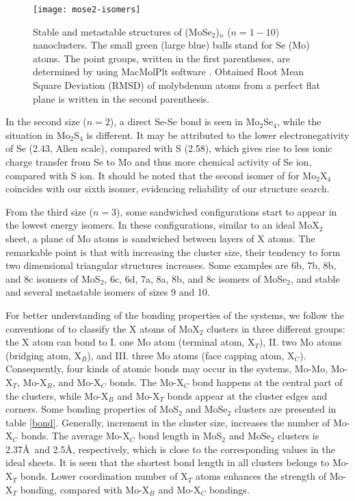 \documentclass[nofootinbib,10pt,aip,twocolumn,showpacs]{revtex4-1}
\begin{document}
\begin{figure*}
\texttt{[image: mose2-isomers]}
\caption{\label{struct-MoSe2}
 Stable and metastable structures of (MoSe$_2$)$_n$ ($n=1-10$) nanoclusters.
 The small green (large blue) balls stand for Se (Mo) atoms.
 The point groups, written in the first parentheses, 
 are determined by using MacMolPlt software \cite{bode1998macmolplt}.
 Obtained Root Mean Square Deviation (RMSD) of molybdenum atoms
 from a perfect flat plane is written in the second parenthesis.
}
\end{figure*}


In the second size ($n=2$), a direct Se-Se bond is seen in Mo$_{2}$Se$_{4}$,
while the situation in Mo$_{2}$S$_{4}$ is different.
It may be attributed to the lower electronegativity of Se (2.43, Allen scale),
compared with S (2.58), which gives rise to less ionic charge transfer from Se to Mo
and thus more chemical activity of Se ion, compared with S ion.
It should be noted that the second isomer of \textcite{murugan2005a} for Mo$_{2}$X$_{4}$
coincides with our sixth isomer, evidencing reliability of our structure search.

From the third size ($n=3$), some sandwiched configurations start 
to appear in the lowest energy isomers. 
In these configurations, similar to an ideal MoX$_2$ sheet, a plane of Mo atoms
is sandwiched between layers of X atoms.
The remarkable point is that with increasing the cluster size, 
their tendency to form two dimensional triangular structures increases.
Some examples are 6b, 7b, 8b, and 8c isomers of MoS$_2$, 6c, 6d, 7a, 8a, 8b, and 8c isomers 
of MoSe$_2$, and stable and several metastable isomers of 
sizes 9 and 10.

For better understanding of the bonding properties of the systems,
we follow the conventions of \textcite{murugan2005a} 
to classify the X atoms of MoX$_2$ clusters in three different groups: 
the X atom can bond to 
I. one Mo atom (terminal atom, X$_T$), 
II. two Mo atoms (bridging atom, X$_B$), and
III. three Mo atoms (face capping atom, X$_C$).
Consequently, four kinds of atomic bonds may occur in the systems,
Mo-Mo, Mo-X$_T$, Mo-X$_B$, and Mo-X$_C$ bonds.
The Mo-X$_C$ bond happens at the central part of the clusters,
while Mo-X$_B$ and Mo-X$_T$ bonds appear at the cluster edges and corners.
Some bonding properties of MoS$_2$ and MoSe$_2$ clusters are presented in table \ref{bond}.
Generally, increment in the cluster size, increases the number of Mo-X$_{C}$ bonds.
The average Mo-X$_C$ bond length in MoS$_2$ and MoSe$_2$ clusters is 2.37\AA\
and 2.5\AA, respectively, which is close to the corresponding values
in the ideal sheets.
It is seen that the shortest bond length in all clusters belongs to Mo-X$_T$ bonds.
Lower coordination number of X$_T$ atoms enhances the strength of Mo-X$_T$ bonding,
compared with Mo-X$_B$ and Mo-X$_C$ bondings.
\end{document}
